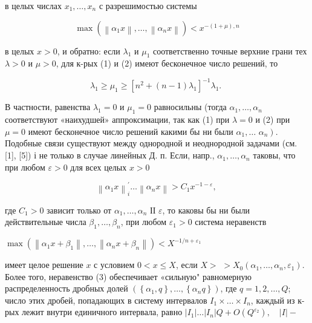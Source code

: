 \documentclass[10pt]{article}
\begin{document}
в целых числах $x_{1}, \ldots, x_{n}$ с разрешимостью системы



\[

\max \left(\left\|\alpha_{1} x\right\|, \ldots,\left\|\alpha_{n} x\right\|\right)<x^{-(1+\mu), n}

\]



в целых $x>0$, и обратно: если $\lambda_{1}$ и $\mu_{1}$ соответственно точные верхние грани тех $\lambda>0$ и $\mu>0$, для к-рых (1) и (2) имеют бесконечное число решений, то



\[

\lambda_{1} \geqslant \mu_{1} \geqslant\left[n^{2}+(n-1) \lambda_{1}\right]^{-1} \lambda_{1} \text {. }

\]



В частности, равенства $\lambda_{1}=0$ и $\mu_{1}=0$ равносильны (тогда $\alpha_{1}, \ldots, \alpha_{n}$ соответствуют «наихудшей» аппроксимации, так как (1) при $\lambda=0$ и (2) при $\mu=0$ имеют бесконечное число решений какими бы ни были $\alpha_{1}, \ldots$ $\left.\alpha_{n}\right)$. Подобные связи существуют между однородной и неоднородной задачами (см. [1], [5]) і не только в случае линейных Д. п. Если, напр., $\alpha_{1}, \ldots, \alpha_{n}$ таковы, что при любом $\varepsilon>0$ для всех целых $x>0$



\[

\left\|\alpha_{1} x\right\|_{i}^{\prime} \ldots\left\|\alpha_{n} x\right\|>C_{1} x^{-1-\varepsilon} \text {, }

\]



где $C_{1}>0$ зависит только от $\alpha_{1}, \ldots, \alpha_{n}$ ІІ $\varepsilon$, то каковы бы ни были действительные числа $\beta_{1}, \ldots, \beta_{n}$, при любом $\varepsilon_{1}>0$ система неравенств



$\max \left(\left\|\alpha_{1} x+\beta_{1}\right\|, \ldots,\left\|\alpha_{n} x+\beta_{n}\right\|\right)<X^{-1 / n+\varepsilon_{1}}$



имеет целое решение $x$ с условием $0<x \leqslant X$, если $X>$ $>X_{0}\left(\alpha_{1}, \ldots, \alpha_{n}, \varepsilon_{1}\right)$. Более того, неравенство (3) обеспечивает «сильную" равномерную распределенность дробных долей $\left(\left\{\alpha_{1}, q\right\}, \ldots,\left\{\alpha_{n} q\right\}\right)$, где $q=1,2, \ldots, Q$; число этих дробей, попадающих в систему интервалов $I_{1} \times \ldots \times I_{n}$, каждый из к-рых лежит внутри единичного интервала, равно $\left|I_{1}\right| \ldots\left|I_{n}\right| Q+O\left(Q^{\varepsilon_{2}}\right), \quad|I|-$
\end{document}
